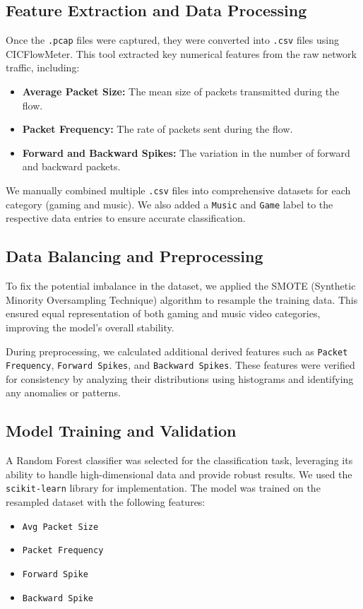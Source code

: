 \subsection{Feature Extraction and Data Processing}
Once the \texttt{.pcap} files were captured, they were converted into \texttt{.csv} files using CICFlowMeter. This tool extracted key numerical features from the raw network traffic, including:
\begin{itemize}
    \item \textbf{Average Packet Size:} The mean size of packets transmitted during the flow.
    \item \textbf{Packet Frequency:} The rate of packets sent during the flow.
    \item \textbf{Forward and Backward Spikes:} The variation in the number of forward and backward packets.
\end{itemize}

We manually combined multiple \texttt{.csv} files into comprehensive datasets for each category (gaming and music). We also added a \texttt{Music} and \texttt{Game} label to the respective data entries to ensure accurate classification.

\subsection{Data Balancing and Preprocessing}
To fix the potential imbalance in the dataset, we applied the SMOTE (Synthetic Minority Oversampling Technique) algorithm to resample the training data. This ensured equal representation of both gaming and music video categories, improving the model's overall stability.

During preprocessing, we calculated additional derived features such as \texttt{Packet Frequency}, \texttt{Forward Spikes}, and \texttt{Backward Spikes}. These features were verified for consistency by analyzing their distributions using histograms and identifying any anomalies or patterns.

\subsection{Model Training and Validation}
A Random Forest classifier was selected for the classification task, leveraging its ability to handle high-dimensional data and provide robust results. We used the \texttt{scikit-learn} library for implementation. 
The model was trained on the resampled dataset with the following features:
\begin{itemize}
    \item \texttt{Avg Packet Size}
    \item \texttt{Packet Frequency}
    \item \texttt{Forward Spike}
    \item \texttt{Backward Spike}
\end{itemize}


